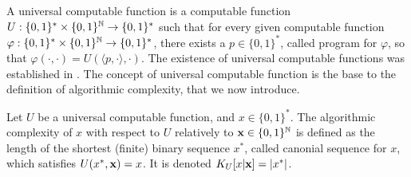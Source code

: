 

A universal computable function is a computable function $U : \{0,1\}^\ast \times \{0,1\}^{\mathbb{N}} \to \{0,1\}^\ast$ such that for every given computable function $\varphi: \{0,1\}^\ast \times \{0,1\}^{\mathbb{N}} \to \{0,1\}^\ast$, there exists a $p \in \{0,1\}^\ast$, called program for $\varphi$, so that $\varphi(\cdot, \cdot) = U(\langle p, \cdot \rangle, \cdot)$. The existence of universal computable functions was established in \cite{turing1936computable}. The concept of universal computable function is the base to the definition of algorithmic complexity, that we now introduce. 
\begin{definition}
	Let $U$ be a universal computable function, and $x \in \{0,1\}^\ast$. The algorithmic complexity of $x$ with respect to $U$ relatively to ${\bf x} \in \{0,1\}^{\mathbb{N}}$ is defined as the length of the shortest (finite) binary sequence $x^\ast$, called canonial sequence for $x$, which satisfies $U(x^\ast, {\bf x}) = x$. It is denoted $K_U[x|{\bf x}] = |x^\ast|$.
\end{definition}


